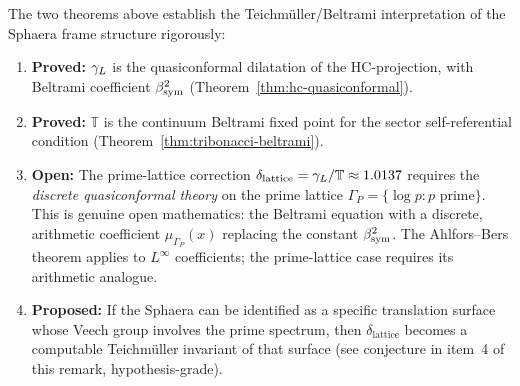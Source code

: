 \begin{remark}
\label{rem:teichmuller-status}
The two theorems above establish the Teichmüller/Beltrami interpretation
of the Sphaera frame structure rigorously:
\begin{enumerate}[label=(\arabic*)]
  \item \textbf{Proved:} $\gamma_L$ is the quasiconformal dilatation of the
    HC-projection, with Beltrami coefficient $\beta_{\mathrm{sym}}^2$
    (Theorem~\ref{thm:hc-quasiconformal}).
  \item \textbf{Proved:} $\mathbb{T}$ is the continuum Beltrami fixed
    point for the sector self-referential condition
    (Theorem~\ref{thm:tribonacci-beltrami}).
  \item \textbf{Open:} The prime-lattice correction
    $\delta_{\mathrm{lattice}} = \gamma_L/\mathbb{T} \approx 1.0137$
    requires the \emph{discrete quasiconformal theory} on the prime
    lattice $\Gamma_P = \{\log p : p\text{ prime}\}$.
    This is genuine open mathematics: the Beltrami equation with
    a discrete, arithmetic coefficient $\mu_{\Gamma_P}(x)$ replacing
    the constant $\beta_{\mathrm{sym}}^2$.
    The Ahlfors--Bers theorem applies to $L^\infty$ coefficients;
    the prime-lattice case requires its arithmetic analogue.
  \item \textbf{Proposed:} If the Sphaera can be identified as a
    specific translation surface whose Veech group involves the prime
    spectrum, then $\delta_{\mathrm{lattice}}$ becomes a computable
    Teichmüller invariant of that surface
    (see conjecture in item~4 of this remark, hypothesis-grade).
\end{enumerate}
\end{remark}

